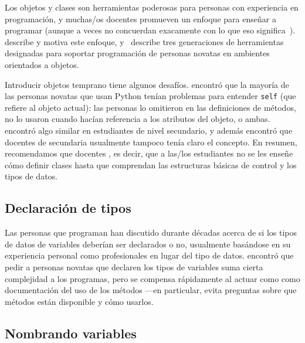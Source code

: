 Los objetos y clases son herramientas poderosas para personas con experiencia en programación,
y muchas/os docentes promueven un enfoque  para enseñar a programar
(aunque a veces no concuerdan exacamente con lo que eso significa~\cite{Benn2007b}).
\cite{Sorv2014} describe y motiva este enfoque,
y~\cite{Koll2015} describe tres generaciones de herramientas
designadas para soportar programación de personas novatas en ambientes orientados a objetos.

Introducir objetos temprano tiene algunos desafíos.
\cite{Mill2016b} encontró que la mayoría de las personas novatas que usan Python
tenían problemas para entender \texttt{self}
(que refiere al objeto actual):
las personas lo omitieron en las definiciones de métodos,
no lo usaron cuando hacían referencia a los atributos del objeto,
o ambas.
\cite{Rago2017} encontró algo similar en estudiantes de nivel secundario,
y además encontró que docentes de secundaria usualmente tampoco tenía claro el concepto.
En resumen,
recomendamos que docentes ,
es decir, que a las/los estudiantes no se les enseñe cómo definir clases
hasta que comprendan las estructuras básicas de control y los tipos de datos.

\subsection*{Declaración de tipos}

Las personas que programan han discutido durante décadas acerca de si los tipos de datos de variables deberían ser declarados o no,
usualmente basándose en su experiencia personal como profesionales
en lugar del tipo de datos.
\cite{Endr2014,Fisc2015} encontró que pedir a personas novatas que declaren los tipos de variables suma cierta complejidad a los programas,
pero se compensa rápidamente al actuar como como documentación del uso de los métodos ---en particular,
evita preguntas sobre que métodos están disponible y cómo usarlos.

\subsection*{Nombrando variables}

